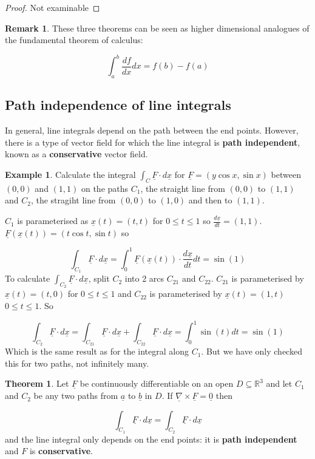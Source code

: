 \documentclass[12pt,a4paper]{article}
\theoremstyle{definition}
\newtheorem{theorem}[definition]{Theorem}
\newtheorem{example}[definition]{Example}
\newtheorem*{remark}{Remark}
\begin{document}
\begin{proof}
	Not examinable
\end{proof}

\begin{remark}
	These three theorems can be seen as higher dimensional analogues of the fundamental theorem of calculus:

	\[ \int_a^b \frac{df}{dx} dx = f(b) - f(a) \]
\end{remark}

\subsection{Path independence of line integrals}

In general, line integrals depend on the path between the end points. However, there is a type of vector field for which the line integral is \textbf{path independent}, known as a \textbf{conservative} vector field.

\begin{example}
	Calculate the integral $\int_C \underline{F} \cdot d\underline{x}$ for $\underline{F} = (y \cos x, \sin x)$ between $(0, 0)$ and $(1, 1)$ on the paths $C_1$, the straight line from $(0, 0)$ to $(1, 1)$ and $C_2$, the stragiht line from $(0, 0)$ to $(1, 0)$ and then to $(1, 1)$.

	$C_1$ is parameterised as $\underline{x}(t) = (t, t)$ for $0 \le t \le 1$ so $\frac{d \underline{x}}{dt} = (1, 1)$. $\underline{F}(\underline{x}(t)) = (t \cos t, \sin t)$ so

	\[ \int_{C_1} \underline{F} \cdot d \underline{x} = \int_0^1 \underline{F}(\underline{x}(t)) \cdot \frac{d \underline{x}}{dt} dt = \sin(1) \]
	To calculate $\int_{C_2} \underline{F} \cdot d \underline{x}$, split $C_2$ into 2 arcs $C_{21}$ and $C_{22}$. $C_{21}$ is parameterised by $\underline{x}(t) = (t, 0)$ for $0 \le t \le 1$ and $C_{22}$ is parameterised by $\underline{x}(t) = (1, t)$ $0 \le t \le 1$. So

	\[ \int_{C_2} \underline{F} \cdot d \underline{x} = \int_{C_{21}} \underline{F} \cdot d \underline{x} + \int_{C_{22}} \underline{F} \cdot d \underline{x} = \int_0^1 \sin(t) dt = \sin(1) \]
	Which is the same result as for the integral along $C_1$. But we have only checked this for two paths, not infinitely many.
\end{example}

\begin{theorem}
	Let $\underline{F}$ be continuously differentiable on an open $D \subseteq \mathbb{R}^3$ and let $C_1$ and $C_2$ be any two paths from $\underline{a}$ to $\underline{b}$ in $D$. If $\underline{\nabla} \times \underline{F} = \underline{0}$ then
	
	\[ \int_{C_1} \underline{F} \cdot d\underline{x} = \int_{C_2} \underline{F} \cdot d\underline{x} \]
	and the line integral only depends on the end points: it is \textbf{path independent} and $F$ is \textbf{conservative}.
\end{theorem}
	
\end{document}
